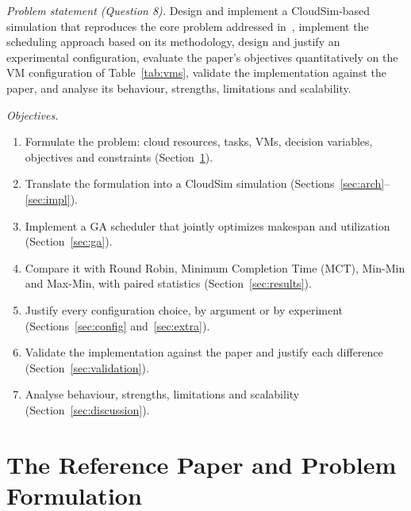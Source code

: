 \documentclass[journal,onecolumn,12pt]{IEEEtran}
\begin{document}
\textit{Problem statement (Question 8).} Design and implement a CloudSim-based simulation that reproduces the core problem addressed in~\cite{dehury}, implement the scheduling approach based on its methodology, design and justify an experimental configuration, evaluate the paper's objectives quantitatively on the VM configuration of Table~\ref{tab:vms}, validate the implementation against the paper, and analyse its behaviour, strengths, limitations and scalability.

\textit{Objectives.}
\begin{enumerate}
\item Formulate the problem: cloud resources, tasks, VMs, decision variables, objectives and constraints (Section~\ref{sec:formulation}).
\item Translate the formulation into a CloudSim simulation (Sections~\ref{sec:arch}--\ref{sec:impl}).
\item Implement a GA scheduler that jointly optimizes makespan and utilization (Section~\ref{sec:ga}).
\item Compare it with Round Robin, Minimum Completion Time (MCT), Min-Min and Max-Min, with paired statistics (Section~\ref{sec:results}).
\item Justify every configuration choice, by argument or by experiment (Sections~\ref{sec:config} and~\ref{sec:extra}).
\item Validate the implementation against the paper and justify each difference (Section~\ref{sec:validation}).
\item Analyse behaviour, strengths, limitations and scalability (Section~\ref{sec:discussion}).
\end{enumerate}

\section{The Reference Paper and Problem Formulation}\label{sec:formulation}
\end{document}
